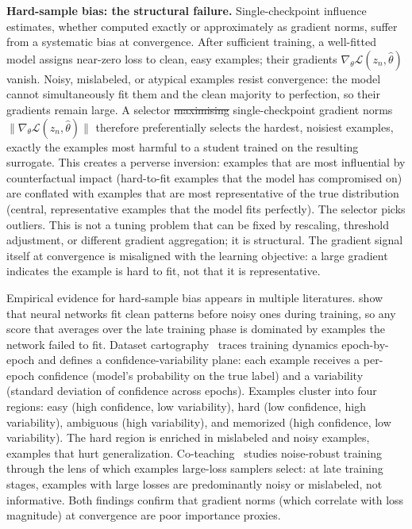 \documentclass[12pt, a4paper, twoside]{book}
\makeatletter
\numberwithin{equation}{chapter}
\theoremstyle{plain}
\theoremstyle{definition}
\theoremstyle{remark}
\newenvironment{foldable}{}{}
\providecommand{\DIFaddtex}[1]{{\protect\color{blue}\uwave{#1}}} %
\providecommand{\DIFdeltex}[1]{{\protect\color{red}\sout{#1}}} %
\providecommand{\DIFaddbegin}{} %
\providecommand{\DIFaddend}{} %
\providecommand{\DIFdelbegin}{} %
\providecommand{\DIFdelend}{} %
\providecommand{\DIFadd}[1]{\texorpdfstring{\DIFaddtex{#1}}{#1}} %
\providecommand{\DIFdel}[1]{\texorpdfstring{\DIFdeltex{#1}}{}} %
\newcommand{\DIFscaledelfig}{0.5}
\newlength{\DIFdelgraphicswidth} %
\newlength{\DIFdelgraphicsheight} %
\newcommand{\DIFaddincludegraphics}[2][]{{\color{blue}\fbox{\DIFOincludegraphics[#1]{#2}}}} %
\newcommand{\DIFdelincludegraphics}[2][]{%
\sbox{\DIFdelgraphicsbox}{\DIFOincludegraphics[#1]{#2}}%
\settoboxwidth{\DIFdelgraphicswidth}{\DIFdelgraphicsbox} %
\settoboxtotalheight{\DIFdelgraphicsheight}{\DIFdelgraphicsbox} %
\scalebox{\DIFscaledelfig}{%
\parbox[b]{\DIFdelgraphicswidth}{\usebox{\DIFdelgraphicsbox}\\[-\baselineskip] \rule{\DIFdelgraphicswidth}{0em}}\llap{\resizebox{\DIFdelgraphicswidth}{\DIFdelgraphicsheight}{%
\setlength{\unitlength}{\DIFdelgraphicswidth}%
\begin{picture}(1,1)%
\thicklines\linethickness{2pt} %
{\color[rgb]{1,0,0}\put(0,0){\framebox(1,1){}}}%
{\color[rgb]{1,0,0}\put(0,0){\line( 1,1){1}}}%
{\color[rgb]{1,0,0}\put(0,1){\line(1,-1){1}}}%
\end{picture}%
}\hspace*{3pt}}} %
} %
\DeclareRobustCommand{\DIFaddbegin}{\DIFOaddbegin \let\includegraphics\DIFaddincludegraphics} %
\DeclareRobustCommand{\DIFaddend}{\DIFOaddend \let\includegraphics\DIFOincludegraphics} %
\DeclareRobustCommand{\DIFdelbegin}{\DIFOdelbegin \let\includegraphics\DIFdelincludegraphics} %
\DeclareRobustCommand{\DIFdelend}{\DIFOaddend \let\includegraphics\DIFOincludegraphics} %
\let\sout@orig\sout %
\renewcommand{\sout}[1]{\ifmmode\text{\sout@orig{\ensuremath{#1}}}\else\sout@orig{#1}\fi} %
\makeatother
\begin{document}
\begin{foldable}
  \textbf{Hard-sample bias: the structural failure.}
  Single-checkpoint influence estimates, whether computed exactly or approximately as gradient norms, suffer from a systematic bias at convergence.
  After sufficient training, a well-fitted model assigns near-zero loss to clean, easy examples; their gradients $\nabla_\theta \mathcal{L}(z_n, \hat\theta)$ vanish.
  Noisy, mislabeled, or atypical examples resist convergence: the model cannot simultaneously fit them and the clean majority to perfection, so their gradients remain large.
  A selector \DIFdelbegin \DIFdel{maximising }\DIFdelend \DIFaddbegin \DIFadd{maximizing }\DIFaddend single-checkpoint gradient norms $\|\nabla_\theta \mathcal{L}(z_n, \hat\theta)\|$ therefore preferentially selects the hardest, noisiest examples, exactly the examples most harmful to a student trained on the resulting surrogate.
  This creates a perverse inversion: examples that are most influential by counterfactual impact (hard-to-fit examples that the model has compromised on) are conflated with examples that are most representative of the true distribution (central, representative examples that the model fits perfectly).
  The selector picks outliers.
  This is not a tuning problem that can be fixed by rescaling, threshold adjustment, or different gradient aggregation; it is structural.
  The gradient signal itself at convergence is misaligned with the learning objective: a large gradient indicates the example is hard to fit, not that it is representative.
\end{foldable}

\begin{foldable}
  Empirical evidence for hard-sample bias appears in multiple literatures.
  \cite{arpit2017closer} show that neural networks fit clean patterns before noisy ones during training, so any score that averages over the late training phase is dominated by examples the network failed to fit.
  Dataset cartography~\cite{swayamdipta2020dataset} traces training dynamics epoch-by-epoch and defines a confidence-variability plane: each example receives a per-epoch confidence (model's probability on the true label) and a variability (standard deviation of confidence across epochs).
  Examples cluster into four regions: easy (high confidence, low variability), hard (low confidence, high variability), ambiguous (high variability), and memorized (high confidence, low variability).
  The hard region is enriched in mislabeled and noisy examples, examples that hurt generalization.
  Co-teaching~\cite{han2018co} studies noise-robust training through the lens of which examples large-loss samplers select: at late training stages, examples with large losses are predominantly noisy or mislabeled, not informative.
  Both findings confirm that gradient norms (which correlate with loss magnitude) at convergence are poor importance proxies.
\end{foldable}
\end{document}
